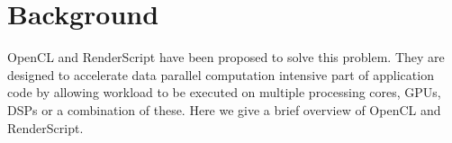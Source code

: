\section{Background}
\label{sec:background}


OpenCL and RenderScript have been proposed to solve this problem. They are
designed to accelerate data parallel computation intensive part of application
code by allowing workload to be executed on multiple processing cores, GPUs,
DSPs or a combination of these. Here we give a brief overview of OpenCL and
RenderScript.



